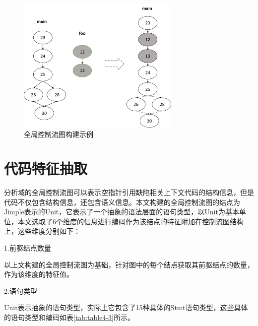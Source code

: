 \begin{figure}
	\centering
	\includegraphics[width=0.70\textwidth]{figures/ICFG4-6}
	\caption{全局控制流图构建示例}\label{fig:figure4-6}
\end{figure}



\section{代码特征抽取}
分析域的全局控制流图可以表示空指针引用缺陷相关上下文代码的结构信息，但是代码不仅包含结构信息，还包含语义信息。本文构建的全局控制流图的结点为Jimple表示的Unit，它表示了一个抽象的语法层面的语句类型，以Unit为基本单位，本文选取了6个维度的信息进行编码作为该结点的特征附加在控制流图结构上，这些维度分别如下：

1.前驱结点数量

以上文构建的全局控制流图为基础，针对图中的每个结点获取其前驱结点的数量，作为该维度的特征值。

2.语句类型

Unit表示抽象的语句类型，实际上它包含了15种具体的Stmt语句类型，这些具体的语句类型和编码如表\ref{tab:table4-3}所示。

